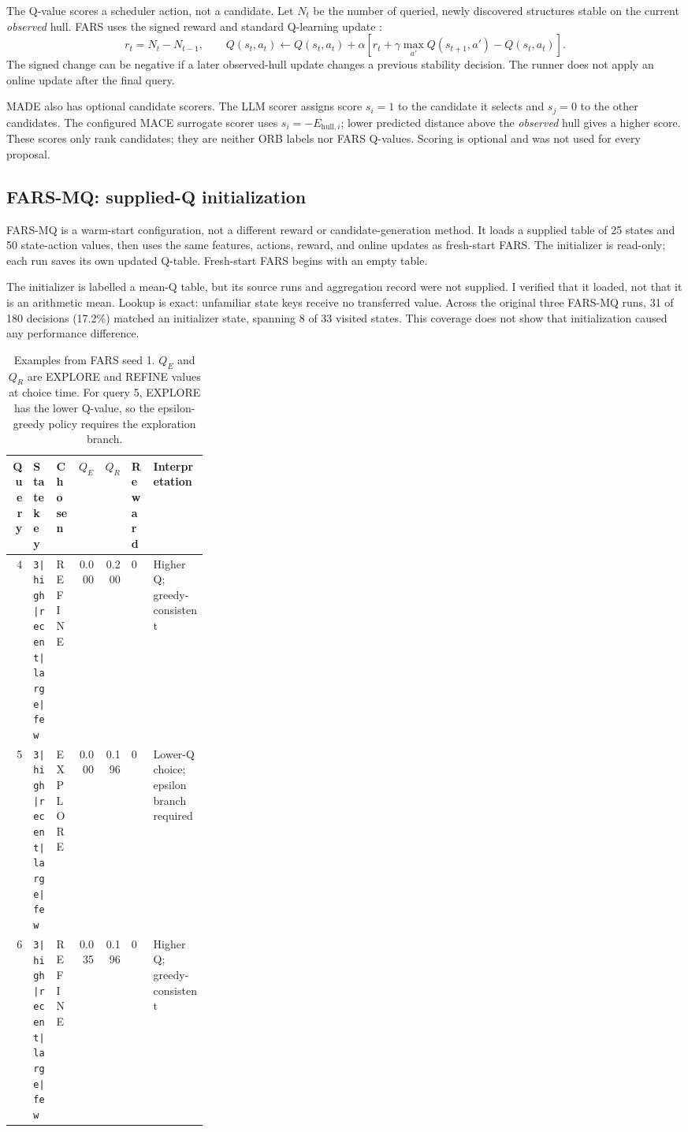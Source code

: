 \documentclass[11pt,a4paper]{article}
\begin{document}
The Q-value scores a scheduler action, not a candidate. Let \(N_t\) be the
number of queried, newly discovered structures stable on the current
\emph{observed} hull. FARS uses the signed reward and standard Q-learning
update \cite{watkins}:
\begin{equation}
 r_t=N_t-N_{t-1}, \qquad
 Q(s_t,a_t)\leftarrow Q(s_t,a_t)+\alpha
 \left[r_t+\gamma\max_{a'}Q(s_{t+1},a')-Q(s_t,a_t)\right].
\end{equation}
The signed change can be negative if a later observed-hull update changes a
previous stability decision. The runner does not apply an online update
after the final query.

MADE also has optional candidate scorers. The LLM scorer assigns score
\(s_i=1\) to the candidate it selects and \(s_j=0\) to the other candidates.
The configured MACE surrogate scorer uses \(s_i=-E_{\mathrm{hull},i}\);
lower predicted distance above the \emph{observed} hull gives a higher score.
These scores only rank candidates; they are neither ORB labels nor FARS
Q-values. Scoring is optional and was not used for every proposal.

\subsection{FARS-MQ: supplied-Q initialization}
FARS-MQ is a warm-start configuration, not a different reward or
candidate-generation method. It loads a supplied table of 25 states and 50
state-action values, then uses the same features, actions, reward, and
online updates as fresh-start FARS. The initializer is read-only; each run
saves its own updated Q-table. Fresh-start FARS begins with an empty table.

The initializer is labelled a mean-Q table, but its source runs and
aggregation record were not supplied. I verified that it loaded, not that it
is an arithmetic mean. Lookup is exact: unfamiliar state keys receive no
transferred value. Across the original three FARS-MQ runs, 31 of 180
decisions (17.2\%) matched an initializer state, spanning 8 of 33 visited
states. This coverage does not show that initialization caused any
performance difference.

\begin{table}[H]
\centering
\small
\begin{tabular}{@{}rllrrlp{0.29\linewidth}@{}}
\toprule
Query & State key & Chosen & \(Q_E\) & \(Q_R\) & Reward & Interpretation\\
\midrule
4 & \texttt{3|high|recent|large|few} & REFINE & 0.000 & 0.200 & 0 & Higher Q; greedy-consistent\\
5 & \texttt{3|high|recent|large|few} & EXPLORE & 0.000 & 0.196 & 0 & Lower-Q choice; epsilon branch required\\
6 & \texttt{3|high|recent|large|few} & REFINE & 0.035 & 0.196 & 0 & Higher Q; greedy-consistent\\
\bottomrule
\end{tabular}
\caption{Examples from FARS seed 1. \(Q_E\) and \(Q_R\) are EXPLORE and
REFINE values at choice time. For query 5, EXPLORE has the lower Q-value, so
the epsilon-greedy policy requires the exploration branch.}
\label{tab:action}
\end{table}
\end{document}
